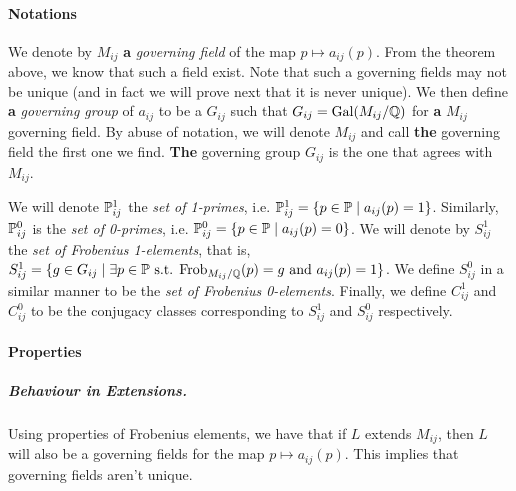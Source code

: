 \paragraph{Notations}
We denote by $M_{ij}$ \textbf{a} \textit{governing field} of the map $p \mapsto a_{ij}(p)$.
From the theorem above, we know that such a field exist.
Note that such a governing fields may not be unique (and in fact we will prove next that it is never unique).
We then define \textbf{a} \textit{governing group} of $a_{ij}$ to be a $G_{ij}$ such that $G_{ij} = \text{Gal}(M_{ij}/\mathbb{Q})$ for \textbf{a} $M_{ij}$ governing field.
By abuse of notation, we will denote $M_{ij}$ and call \textbf{the} governing field the first one we find.
\textbf{The} governing group $G_{ij}$ is the one that agrees with $M_{ij}$.

We will denote $\mathbb{P}_{ij}^1$ the \textit{set of 1-primes}, i.e. $\mathbb{P}_{ij}^1 = \{ p \in \mathbb{P} \mid a_{ij}(p)=1 \}$.
Similarly, $\mathbb{P}_{ij}^0$ is the \textit{set of 0-primes}, i.e. $\mathbb{P}_{ij}^0 = \{ p \in \mathbb{P} \mid a_{ij}(p)=0 \}$.
We will denote by $S_{ij}^1$ the \textit{set of Frobenius 1-elements}, that is, $S_{ij}^1 = \{ g \in G_{ij} \mid \exists p \in \mathbb{P} \text{ s.t. } \text{Frob}_{M_{ij}/\mathbb{Q}}(p)=g \text{ and } a_{ij}(p)=1 \}$.
We define $S_{ij}^0$ in a similar manner to be the \textit{set of Frobenius 0-elements}.
Finally, we define $C_{ij}^1$ and $C_{ij}^0$ to be the conjugacy classes corresponding to $S_{ij}^1$ and $S_{ij}^0$ respectively.

\paragraph{Properties}
\subparagraph{Behaviour in Extensions.}
Using properties of Frobenius elements, we have that if $L$ extends $M_{ij}$, then $L$ will also be a governing fields for the map $p \mapsto a_{ij}(p)$.
This implies that governing fields aren't unique.

